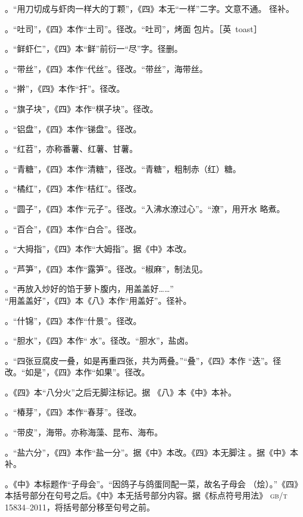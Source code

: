 \begin{list}{}
。“用刀切成与虾肉一样大的丁颗”，《四》本无“一样”二字。文意不通。
径补。

。“吐司”，《四》本作“土司”。径改。“吐司”，烤面
包片。［英~toast］

。“鲜虾仁”，《四》本“鲜”前衍一“尽”字。径删。

。“带丝”，《四》本作“代丝”。径改。“带丝”，海带丝。

。“擀”，《四》本作“扞”。径改。

。“旗子块”，《四》本作“棋子块”。径改。

。“铝盘”，《四》本作“锑盘”。径改。

。“红苕”，亦称番薯、红薯、甘薯。

。“青糖”，《四》本作“清糖”，径改。“青糖”，粗制赤（红）糖。

。“橘红”，《四》本作“桔红”。径改。

。“圆子”，《四》本作“元子”。径改。“入沸水潦过心”。“潦”，用开水
略煮。

。“百合”，《四》本作“白合”。径改。

。“大拇指”，《四》本作“大姆指”。据《中》本改。

。“芦笋”，《四》本作“露笋”。径改。“椒麻”，制法见。

。“再放入炒好的馅于萝卜腹内，用盖盖好……”\\%
“用盖盖好”，《四》本《八》本作“用盖好”。径补。

。“什锦”，《四》本作“什景”。径改。

。“胆水”，《四》本作“𥑲水”。径改。“胆水”，盐卤。

。“四张豆腐皮一叠，如是再重四张，共为两叠。”“叠”，《四》本作
“迭”。径改。“如是”，《四》本作“如果”。径改。

。《四》本“八分火”之后无脚注标记{\footnotesize{}}。据
《八》本《中》本补。

。“椿芽”，《四》本作“春芽”。径改。

。“带皮”，海带。亦称海藻、昆布、海布。

。“盐六分”，《四》本作“盐一分”。据《中》本改。《四》本无脚注%
{\footnotesize{}}。据《中》本补。

。《中》本标题作“子母会”。“因鸽子与鸽蛋同配一菜，故名子母会
（烩）。”《四》本括号部分在句号之后。《中》本无括号部分内容。据《标点符号用法》
\textsc{gb/t 15834--2011}，将括号部分移至句号之前。


\end{list}
